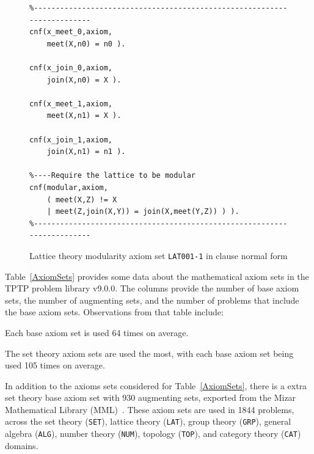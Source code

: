 \documentclass[runningheads]{llncs}
\newenvironment{packed_itemize}{
\vspace*{-0.2em}
\begin{itemize}
\setlength{\partopsep}{0pt}
\setlength{\itemsep}{1pt}
\setlength{\parskip}{0pt}
\setlength{\parsep}{0pt}
}{\end{itemize}}
\begin{document}
\begin{figure}[tb]
\centering
{\footnotesize
{\setlength{\baselineskip}{3mm}
\begin{verbatim}
%------------------------------------------------------------------------
cnf(x_meet_0,axiom,
    meet(X,n0) = n0 ).

cnf(x_join_0,axiom,
    join(X,n0) = X ).

cnf(x_meet_1,axiom,
    meet(X,n1) = X ).

cnf(x_join_1,axiom,
    join(X,n1) = n1 ).

%----Require the lattice to be modular
cnf(modular,axiom,
    ( meet(X,Z) != X
    | meet(Z,join(X,Y)) = join(X,meet(Y,Z)) ) ).
%------------------------------------------------------------------------
\end{verbatim}
}}
\caption{Lattice theory modularity axiom set {\tt LAT001-1} in clause normal form}
\label{ExampleAxioms1}
\end{figure}

Table~\ref{AxiomSets} provides some data about the mathematical axiom sets in the TPTP problem 
library v9.0.0.
The columns provide the number of base axiom sets, the number of augmenting sets, and
the number of problems that include the base axiom sets.
Observations from that table include:
\begin{packed_itemize}
\item Each base axiom set is used 64 times on average.
\item The set theory axiom sets are used the most, with each base axiom set being used 105
      times on average.
\end{packed_itemize}

In addition to the axioms sets considered for Table~\ref{AxiomSets}, there is a extra set theory 
base axiom set with 930 augmenting sets, exported from the Mizar Mathematical 
Library (MML)~\cite{Urb06}.
These axiom sets are used in 1844 problems, across the set theory ({\tt SET}), lattice theory 
({\tt LAT}), group theory ({\tt GRP}), general algebra ({\tt ALG}), number theory ({\tt NUM}), 
topology ({\tt TOP}), and category theory ({\tt CAT}) domains.
\end{document}
